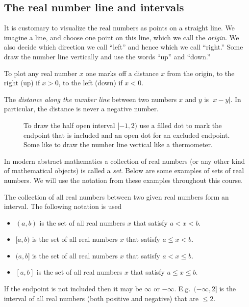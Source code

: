 \subsection{The real number line and intervals}
It is customary to visualize the real numbers as points on a straight
line.  We imagine a line, and choose one point on this line, which we
call the \emph{origin}.  We also decide which direction we call
``left'' and hence which we call ``right.''  Some draw the number line
vertically and use the words ``up'' and ``down.''

To plot any real number $x$ one marks off a distance $x$ from the
origin, to the right (up) if $x>0$, to the left (down) if $x<0$.

The \emph{distance along the number line} between two numbers $x$ and
$y$ is $|x-y|$.  In particular, the distance is never a negative
number.

\begin{figure}[h]\centering
  
  \caption{To draw the half open interval $[-1,2)$ use a filled dot to
    mark the endpoint that is included and an open dot for an excluded
    endpoint.  Some like to draw the number line vertical like a
    thermometer.  }
  \label{fig:01drawaninterval}
\end{figure}
\marginpar{}%

In modern abstract mathematics a collection of real numbers (or any
other kind of mathematical objects) is called a \emph{set}.  Below are
some examples of sets of real numbers.  We will use the notation from
these examples throughout this course.

The collection of all real numbers between two given real numbers form
an interval.  The following notation is used
\begin{itemize}
\item $(a,b)$ is the set of all real numbers $x$ that satisfy $a<x<b$.
\item $[a, b)$ is the set of all real numbers $x$ that satisfy $a\leq x<b$.
\item $(a, b]$ is the set of all real numbers $x$ that satisfy $a< x\leq b$.
\item $[a, b]$ is the set of all real numbers $x$ that satisfy $a\leq x\leq b$.
\end{itemize}
If the endpoint is not included then it may be $\infty$ or $-\infty$.
E.g.\ $(-\infty, 2]$ is the interval of all real numbers (both
positive and negative) that are $\leq 2$.

